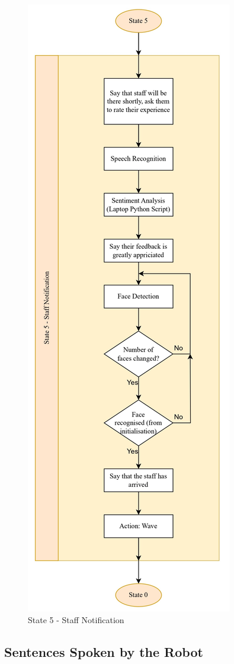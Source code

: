 \documentclass[conference]{IEEEtran}
\begin{document}
\begin{figure}
    \centering
    \includegraphics[width=.6\linewidth]{State 5 - Staff Notification.jpg}
    \caption{State 5 - Staff Notification}
    \label{State 5 - Staff Notification}
\end{figure}


\subsection{Sentences Spoken by the Robot}
\end{document}
